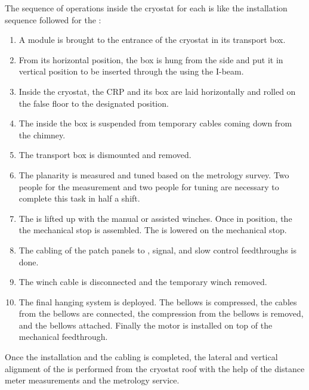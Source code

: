 The sequence of operations inside the cryostat for each  is like the installation sequence followed for the :
\begin{enumerate}
\item A  module is brought to the entrance of the cryostat in its transport box.
\item From its horizontal position, the box is hung from the side and put it in vertical position to be inserted through the  using the  I-beam.
\item Inside the cryostat, the CRP and its box are laid horizontally and rolled on the false floor to the designated position.
\item The  inside the box is suspended from temporary cables coming down from the chimney.
\item The transport box is dismounted and removed.
\item The  planarity is measured and tuned based on the metrology survey.
Two people for the measurement and two people for tuning are necessary to complete this task in half a shift. %
\item The  is lifted up with the manual or assisted winches. Once in position, the the mechanical stop is assembled. The  is lowered on the mechanical stop.
\item The cabling of the  patch panels to , signal, and slow control feedthroughs is done.
\item The winch cable is disconnected and the temporary winch removed.
\item The final hanging system is deployed. The bellows is compressed, the cables from the bellows are connected, the compression from the bellows is removed, and the bellows attached.  Finally the motor is installed on top of the mechanical feedthrough.
\end{enumerate}
Once the installation and the cabling is completed, the lateral and vertical alignment of the  is performed from the cryostat roof with the help of the distance meter measurements and the metrology service.


